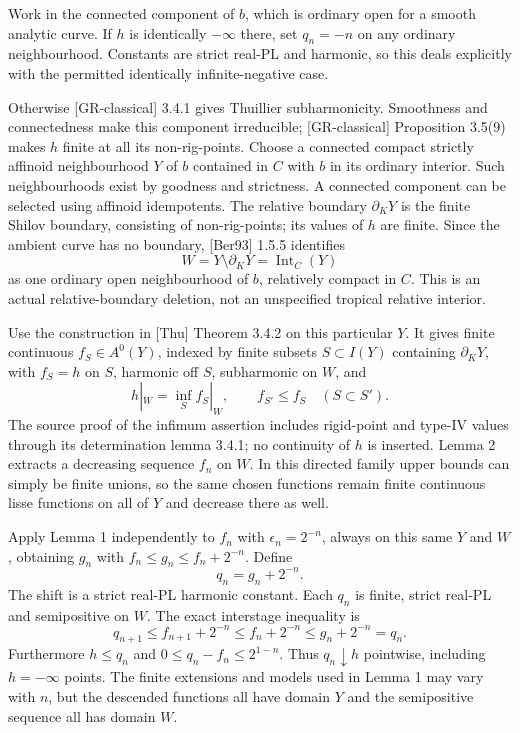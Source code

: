 \documentclass[
  11pt,
]{article}
\begin{document}
Work in the connected component of \(b\), which is ordinary open for a
smooth analytic curve. If \(h\) is identically \(-\infty\) there, set
\(q_n=-n\) on any ordinary neighbourhood. Constants are strict real-PL
and harmonic, so this deals explicitly with the permitted identically
infinite-negative case.

Otherwise {[}GR-classical{]} 3.4.1 gives Thuillier subharmonicity.
Smoothness and connectedness make this component irreducible;
{[}GR-classical{]} Proposition 3.5(9) makes \(h\) finite at all its
non-rig-points. Choose a connected compact strictly affinoid
neighbourhood \(Y\) of \(b\) contained in \(C\) with \(b\) in its
ordinary interior. Such neighbourhoods exist by goodness and strictness.
A connected component can be selected using affinoid idempotents. The
relative boundary \(\partial_KY\) is the finite Shilov boundary,
consisting of non-rig-points; its values of \(h\) are finite. Since the
ambient curve has no boundary, {[}Ber93{]} 1.5.5 identifies
\[W=Y\setminus\partial_KY=\operatorname{Int}_C(Y)\] as one ordinary open
neighbourhood of \(b\), relatively compact in \(C\). This is an actual
relative-boundary deletion, not an unspecified tropical relative
interior.

Use the construction in {[}Thu{]} Theorem 3.4.2 on this particular
\(Y\). It gives finite continuous \(f_S\in A^0(Y)\), indexed by finite
subsets \(S\subset I(Y)\) containing \(\partial_KY\), with \(f_S=h\) on
\(S\), harmonic off \(S\), subharmonic on \(W\), and
\[h|_W=\inf_S f_S|_W,\qquad f_{S'}\le f_S\quad(S\subset S').\] The
source proof of the infimum assertion includes rigid-point and type-IV
values through its determination lemma 3.4.1; no continuity of \(h\) is
inserted. Lemma 2 extracts a decreasing sequence \(f_n\) on \(W\). In
this directed family upper bounds can simply be finite unions, so the
same chosen functions remain finite continuous lisse functions on all of
\(Y\) and decrease there as well.

Apply Lemma 1 independently to \(f_n\) with \(\epsilon_n=2^{-n}\),
always on this same \(Y\) and \(W\), obtaining \(g_n\) with
\(f_n\le g_n\le f_n+2^{-n}\). Define \[q_n=g_n+2^{-n}.\] The shift is a
strict real-PL harmonic constant. Each \(q_n\) is finite, strict real-PL
and semipositive on \(W\). The exact interstage inequality is
\[q_{n+1}\le f_{n+1}+2^{-n}\le f_n+2^{-n}\le g_n+2^{-n}=q_n.\]
Furthermore \(h\le q_n\) and \(0\le q_n-f_n\le2^{1-n}\). Thus
\(q_n\downarrow h\) pointwise, including \(h=-\infty\) points. The
finite extensions and models used in Lemma 1 may vary with \(n\), but
the descended functions all have domain \(Y\) and the semipositive
sequence all has domain \(W\).
\end{document}
